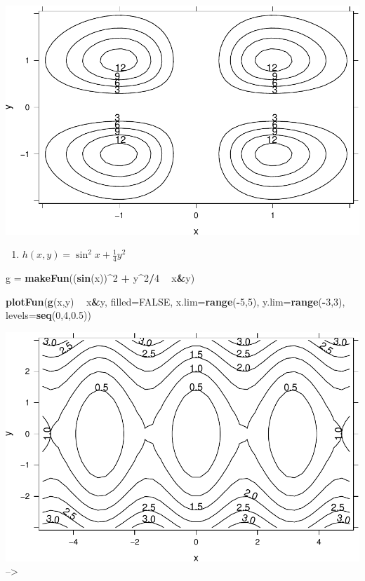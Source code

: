 \documentclass[
]{book}
\newenvironment{Shaded}{\begin{snugshade}}{\end{snugshade}}
\newcommand{\DataTypeTok}[1]{\textcolor[rgb]{0.13,0.29,0.53}{#1}}
\newcommand{\DecValTok}[1]{\textcolor[rgb]{0.00,0.00,0.81}{#1}}
\newcommand{\FloatTok}[1]{\textcolor[rgb]{0.00,0.00,0.81}{#1}}
\newcommand{\KeywordTok}[1]{\textcolor[rgb]{0.13,0.29,0.53}{\textbf{#1}}}
\newcommand{\NormalTok}[1]{#1}
\newcommand{\OperatorTok}[1]{\textcolor[rgb]{0.81,0.36,0.00}{\textbf{#1}}}
\newcommand{\OtherTok}[1]{\textcolor[rgb]{0.56,0.35,0.01}{#1}}
\newcommand{\StringTok}[1]{\textcolor[rgb]{0.31,0.60,0.02}{#1}}
\providecommand{\tightlist}{%
  \setlength{\itemsep}{0pt}\setlength{\parskip}{0pt}}
\begin{document}
\includegraphics{_bookdown_files/math135_handbook_files/figure-latex/unnamed-chunk-82-1.pdf}

\begin{enumerate}
\def\labelenumi{\arabic{enumi}.}
\setcounter{enumi}{2}
\tightlist
\item
  \(h(x,y) = \sin^2x + \frac{1}{4}y^2\)
\end{enumerate}

\begin{Shaded}
\begin{Highlighting}[]
\NormalTok{g =}\StringTok{ }\KeywordTok{makeFun}\NormalTok{((}\KeywordTok{sin}\NormalTok{(x))}\OperatorTok{^}\DecValTok{2} \OperatorTok{+}\StringTok{ }\NormalTok{y}\OperatorTok{^}\DecValTok{2}\OperatorTok{/}\DecValTok{4} \OperatorTok{~}\StringTok{ }\NormalTok{x}\OperatorTok{&}\NormalTok{y)}

\KeywordTok{plotFun}\NormalTok{(}\KeywordTok{g}\NormalTok{(x,y) }\OperatorTok{~}\StringTok{ }\NormalTok{x}\OperatorTok{&}\NormalTok{y, }\DataTypeTok{filled=}\OtherTok{FALSE}\NormalTok{, }\DataTypeTok{x.lim=}\KeywordTok{range}\NormalTok{(}\OperatorTok{-}\DecValTok{5}\NormalTok{,}\DecValTok{5}\NormalTok{), }\DataTypeTok{y.lim=}\KeywordTok{range}\NormalTok{(}\OperatorTok{-}\DecValTok{3}\NormalTok{,}\DecValTok{3}\NormalTok{), }\DataTypeTok{levels=}\KeywordTok{seq}\NormalTok{(}\DecValTok{0}\NormalTok{,}\DecValTok{4}\NormalTok{,}\FloatTok{0.5}\NormalTok{))}
\end{Highlighting}
\end{Shaded}

\includegraphics{_bookdown_files/math135_handbook_files/figure-latex/unnamed-chunk-83-1.pdf}
--\textgreater{}
\end{document}
